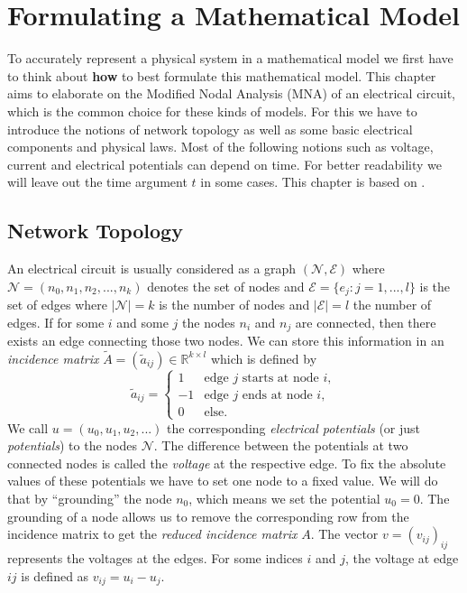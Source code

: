 \chapter{Formulating a Mathematical Model}
\label{sec:formulating a mathematical model}

To accurately represent a physical system in a mathematical model we first have to think about \textbf{how} to best formulate this mathematical model.
This chapter aims to elaborate on the Modified Nodal Analysis (MNA) of an electrical circuit, which is the common choice for these kinds of models. For this we have to introduce the notions of network topology as well as some basic electrical components and physical laws. Most of the following notions such as voltage, current and electrical potentials can depend on time. For better readability we will leave out the time argument $t$ in some cases. This chapter is based on \cite{ModellingAndDiscretizationOfCircuitProblems}.

\section{Network Topology}
\label{Sec:Network Topology}
An electrical circuit is usually considered as a graph $(\mathcal{N},\mathcal{E})$ where $\mathcal{N} = (n_0, n_1, n_2, ..., n_k)$ denotes the set of nodes and $\mathcal{E} = \{e_{j}: j = 1,...,l\}$ is the set of edges where $|\mathcal{N}| = k$ is the number of nodes and $|\mathcal{E}| = l$ the number of edges. If for some $i$ and some $j$ the nodes $n_i$ and  $n_j$ are connected, then there exists an edge connecting those two nodes.
We can store this information in an \emph{incidence matrix} $\tilde{A} = (\tilde{a}_{ij}) \in \mathbb{R}^{k \times l}$ which is defined by
\begin{displaymath}
	\tilde{a}_{ij} = 
	\begin{cases}
		1 &   \text{edge $j$ starts at node $i$},\\
		-1 &  \text{edge $j$  ends at node $i$},\\
		0 & \text{else}.				
	\end{cases}
\end{displaymath}
We call $u = (u_0, u_1, u_2, ...)$ the corresponding \emph{electrical potentials} (or just \emph{potentials}) to the nodes $\mathcal{N}$. The difference between the potentials at two connected nodes is called the \emph{voltage} at the respective edge. To fix the absolute values of these potentials we have to set one node to a fixed value. We will do that by ``grounding'' the node $n_0$, which means we set the potential $u_0 = 0$. The grounding of a node allows us to remove the corresponding row from the incidence matrix to get the \emph{reduced incidence matrix} $A$. The vector $v = (v_{ij})_{ij}$ represents the voltages at the edges. For some indices $i$ and $j$, the voltage at edge $ij$ is defined as $v_{ij} = u_i - u_j$.

